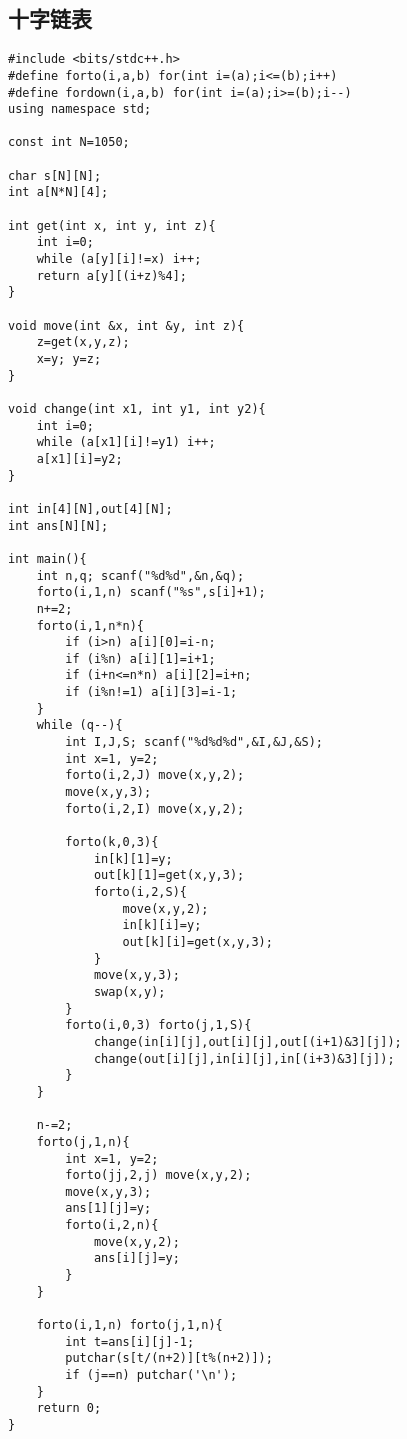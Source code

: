 \documentclass{article}
\begin{document}
\subsection{十字链表}
\begin{lstlisting}
#include <bits/stdc++.h>
#define forto(i,a,b) for(int i=(a);i<=(b);i++)
#define fordown(i,a,b) for(int i=(a);i>=(b);i--)
using namespace std;

const int N=1050;

char s[N][N];
int a[N*N][4];

int get(int x, int y, int z){
	int i=0;
	while (a[y][i]!=x) i++;
	return a[y][(i+z)%4];
}

void move(int &x, int &y, int z){
	z=get(x,y,z);
	x=y; y=z;
}

void change(int x1, int y1, int y2){
	int i=0;
	while (a[x1][i]!=y1) i++;
	a[x1][i]=y2;
}

int in[4][N],out[4][N];
int ans[N][N];

int main(){
	int n,q; scanf("%d%d",&n,&q);
	forto(i,1,n) scanf("%s",s[i]+1);
	n+=2;
	forto(i,1,n*n){
		if (i>n) a[i][0]=i-n;
		if (i%n) a[i][1]=i+1;
		if (i+n<=n*n) a[i][2]=i+n;
		if (i%n!=1) a[i][3]=i-1;
	}
	while (q--){
		int I,J,S; scanf("%d%d%d",&I,&J,&S);
		int x=1, y=2;
		forto(i,2,J) move(x,y,2);
		move(x,y,3);
		forto(i,2,I) move(x,y,2);
		
		forto(k,0,3){
			in[k][1]=y;
			out[k][1]=get(x,y,3);
			forto(i,2,S){
				move(x,y,2);
				in[k][i]=y;
				out[k][i]=get(x,y,3);
			}
			move(x,y,3);
			swap(x,y);
		}
		forto(i,0,3) forto(j,1,S){
			change(in[i][j],out[i][j],out[(i+1)&3][j]);
			change(out[i][j],in[i][j],in[(i+3)&3][j]);
		}
	}
	
	n-=2;
	forto(j,1,n){
		int x=1, y=2;
		forto(jj,2,j) move(x,y,2);
		move(x,y,3);
		ans[1][j]=y;
		forto(i,2,n){
			move(x,y,2);
			ans[i][j]=y;
		}
	}
	
	forto(i,1,n) forto(j,1,n){
		int t=ans[i][j]-1;
		putchar(s[t/(n+2)][t%(n+2)]);
		if (j==n) putchar('\n');
	}
	return 0;
}
\end{lstlisting}
\end{document}
